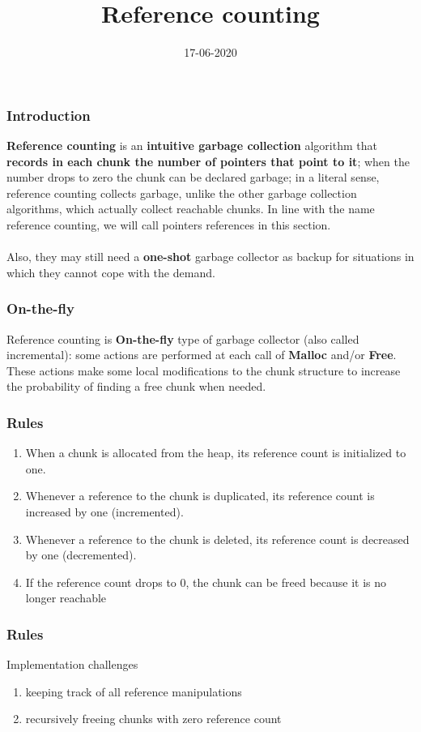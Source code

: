 \documentclass[presentation]{beamer}
\title{Reference counting}
\author[Miroslaw Blazej \&Miroslaw Blazej]
{%
   \texorpdfstring{
        \begin{columns}
            \column{.45\linewidth}
            \centering
            Miroslaw Blazej\\
            \href{mailto:blazej@student.agh.edu.pl}{blazej@student.agh.edu.pl}
            \column{.45\linewidth}
            \centering
            Michal Dygas\\
            \href{mailto:dygas@student.agh.edu.pl}{dygas@student.agh.edu.pl}
        \end{columns}
   }
   {Miroslaw \& Michal}
}
\institute[]{AGH University of Science and Technology}
\date{17-06-2020}
\begin{document}
\begin{frame}
  \titlepage
\end{frame}

\begin{frame}
  \frametitle{Introduction} 
  \justifying
 \textbf{Reference counting} is an \textbf{intuitive garbage collection} algorithm that \textbf{records in
each chunk the number of pointers that point to it}; when the number drops to
zero the chunk can be declared garbage; in a literal sense, reference counting collects garbage, unlike the other garbage collection algorithms, which actually collect
reachable chunks. In line with the name reference counting, we will call pointers
references in this section.
\\~\\
Also, they may still need a \textbf{one-shot} garbage collector as backup for situations in which they cannot cope with the demand.
\end{frame}


\begin{frame}
  \frametitle{On-the-fly} 
  \justifying
Reference counting is \textbf{On-the-fly} type of garbage collector (also called incremental): some actions are performed at each call of \textbf{Malloc} and/or \textbf{Free}. These actions make some local modifications to the chunk structure to increase the probability of finding a free chunk
when needed.
\end{frame}

\begin{frame}
  \frametitle{Rules}
  \justifying
    \begin{enumerate}
    \justifying
        \item When a chunk
is allocated from the heap, its reference count is initialized to one. 
        \item Whenever a
reference to the chunk is duplicated, its reference count is increased by one (incremented).
		\item Whenever a reference to the chunk is deleted, its reference
count is decreased by one (decremented).
		\item If the reference count drops to 0, the
chunk can be freed because it is no longer reachable
    \end{enumerate}  
\end{frame}


\begin{frame}
  \frametitle{Rules}
  \justifying
    \begin{block}{Implementation challenges}
        \begin{enumerate}
            \item keeping track of all
reference manipulations
            \item  recursively freeing chunks with zero reference count
        \end{enumerate}
  	\end{block}
\end{frame}
\end{document}
